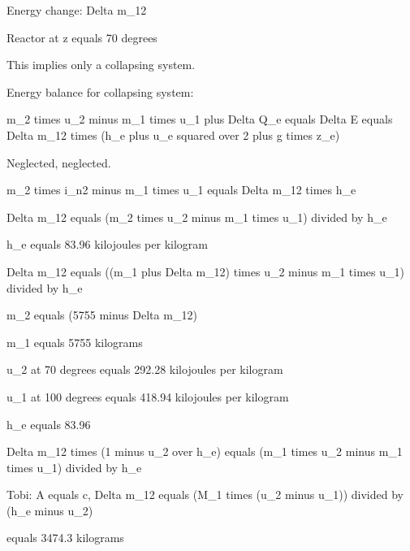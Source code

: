Energy change: Delta m_12

Reactor at z equals 70 degrees

This implies only a collapsing system.

Energy balance for collapsing system:

m_2 times u_2 minus m_1 times u_1 plus Delta Q_e equals Delta E equals Delta m_12 times (h_e plus u_e squared over 2 plus g times z_e)

Neglected, neglected.

m_2 times i_n2 minus m_1 times u_1 equals Delta m_12 times h_e

Delta m_12 equals (m_2 times u_2 minus m_1 times u_1) divided by h_e

h_e equals 83.96 kilojoules per kilogram

Delta m_12 equals ((m_1 plus Delta m_12) times u_2 minus m_1 times u_1) divided by h_e

m_2 equals (5755 minus Delta m_12)

m_1 equals 5755 kilograms

u_2 at 70 degrees equals 292.28 kilojoules per kilogram

u_1 at 100 degrees equals 418.94 kilojoules per kilogram

h_e equals 83.96

Delta m_12 times (1 minus u_2 over h_e) equals (m_1 times u_2 minus m_1 times u_1) divided by h_e

Tobi: A equals c, Delta m_12 equals (M_1 times (u_2 minus u_1)) divided by (h_e minus u_2)

equals 3474.3 kilograms